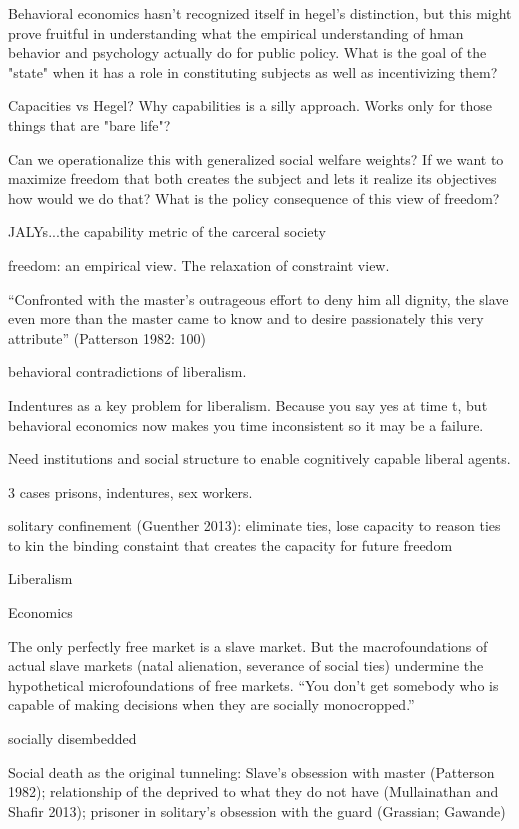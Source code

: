 \documentclass[10pt,a4paper]{article}
\begin{document}
Behavioral economics hasn't recognized itself in hegel's distinction, but this might prove fruitful in understanding what the empirical
understanding of hman behavior and psychology actually do for public policy. What is the goal of the "state" when it has a role in constituting subjects
as well as incentivizing them?

Capacities vs Hegel? Why capabilities is a silly approach. Works only for those things that are "bare life"?

Can we operationalize this with generalized social welfare weights? If we want to maximize freedom that both creates the
subject and lets it realize its objectives how would we do that? What is the policy consequence of this view of freedom?

JALYs...the capability metric of the carceral society


freedom: an empirical view. The relaxation of constraint view.

``Confronted with the master's outrageous effort to deny him all dignity, the slave even more than the master came 
to know and to desire passionately this very attribute'' (Patterson 1982: 100)

behavioral contradictions of liberalism.

Indentures as a key problem for liberalism. Because you say yes at time t, but behavioral economics now makes you time inconsistent
so it may be a failure.

Need institutions and social structure to enable cognitively capable liberal agents.

3 cases
prisons, indentures, sex workers.

solitary confinement (Guenther 2013): eliminate ties, lose capacity to reason
ties to kin the binding constaint that creates the capacity for future freedom

Liberalism



Economics
 
 The only perfectly free market is a slave market. But the macrofoundations of actual slave markets 
 (natal alienation, severance of social ties) undermine the hypothetical microfoundations of free markets. 
 ``You don't get somebody who is capable of making decisions when they are socially monocropped.''
 
 socially disembedded
 
 Social death as the original tunneling: Slave's obsession with master (Patterson 1982); 
 relationship of the deprived to what they do not have (Mullainathan and Shafir 2013); prisoner 
 in solitary's obsession with the guard (Grassian; Gawande)
 
\end{document}
